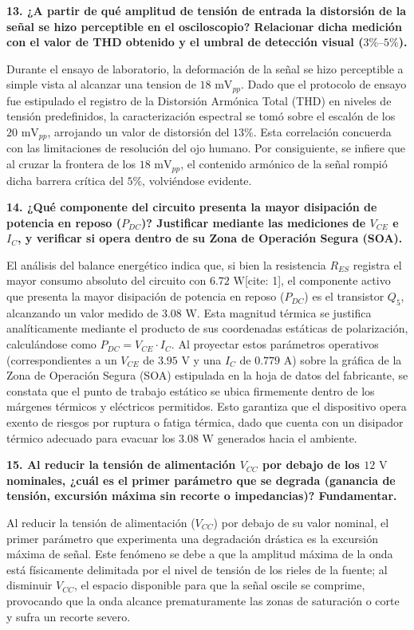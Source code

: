 \textbf{13. ¿A partir de qué amplitud de tensión de entrada la distorsión de la señal se hizo perceptible en el osciloscopio? Relacionar dicha medición con el valor de THD obtenido y el umbral de detección visual ($3\% \text{--} 5\%$).}

Durante el ensayo de laboratorio, la deformación de la señal se hizo perceptible a simple vista al alcanzar una tension de $18\text{ mV}_{pp}$. Dado que el protocolo de ensayo fue estipulado el registro de la Distorsión Armónica Total (THD) en niveles de tensión predefinidos, la caracterización espectral se tomó sobre el escalón de los $20\text{ mV}_{pp}$, arrojando un valor de distorsión del $13\%$. Esta correlación concuerda con las limitaciones de resolución del ojo humano. Por consiguiente, se infiere que al cruzar la frontera de los $18\text{ mV}_{pp}$, el contenido armónico de la señal rompió dicha barrera crítica del $5\%$, volviéndose evidente.

\textbf{14. ¿Qué componente del circuito presenta la mayor disipación de potencia en reposo ($P_{DC}$)? Justificar mediante las mediciones de $V_{CE}$ e $I_C$, y verificar si opera dentro de su Zona de Operación Segura (SOA).}

El análisis del balance energético indica que, si bien la resistencia $R_{ES}$ registra el mayor consumo absoluto del circuito con $6.72\text{ W}$[cite: 1], el componente activo que presenta la mayor disipación de potencia en reposo ($P_{DC}$) es el transistor $Q_5$, alcanzando un valor medido de $3.08\text{ W}$. Esta magnitud térmica se justifica analíticamente mediante el producto de sus coordenadas estáticas de polarización, calculándose como $P_{DC} = V_{CE} \cdot I_C$. Al proyectar estos parámetros operativos (correspondientes a un $V_{CE}$ de $3.95\text{ V}$ y una $I_C$ de $0.779\text{ A}$) sobre la gráfica de la Zona de Operación Segura (SOA) estipulada en la hoja de datos del fabricante, se constata que el punto de trabajo estático se ubica firmemente dentro de los márgenes térmicos y eléctricos permitidos. Esto garantiza que el dispositivo opera exento de riesgos por ruptura o fatiga térmica, dado que cuenta con un disipador térmico  adecuado para evacuar los $3.08\text{ W}$ generados hacia el ambiente.

\textbf{15. Al reducir la tensión de alimentación $V_{CC}$ por debajo de los $12\text{ V}$ nominales, ¿cuál es el primer parámetro que se degrada (ganancia de tensión, excursión máxima sin recorte o impedancias)? Fundamentar.}

Al reducir la tensión de alimentación ($V_{CC}$) por debajo de su valor nominal, el primer parámetro que experimenta una degradación drástica es la excursión máxima de señal. Este fenómeno se debe a que la amplitud máxima de la onda está físicamente delimitada por el nivel de tensión de los rieles de la fuente; al disminuir $V_{CC}$, el espacio disponible para que la señal oscile se comprime, provocando que la onda alcance prematuramente las zonas de saturación o corte y sufra un recorte severo. 

